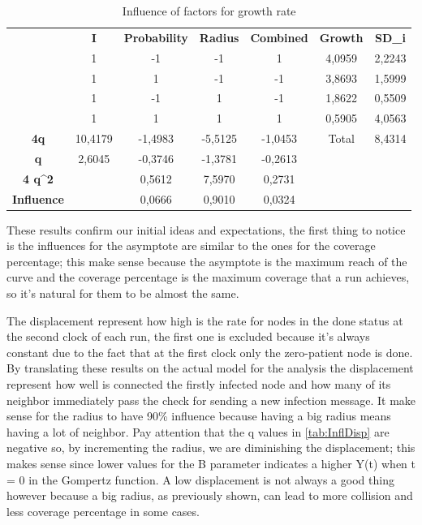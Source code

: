\begin{table}[H]
\centering
\begin{tabular}{c|c|c|c|c|cc}
\cline{2-7}
 & \textbf{I} & \textbf{Probability} & \textbf{Radius} & \textbf{Combined} & \multicolumn{1}{c|}{\textbf{Growth}} & \multicolumn{1}{c|}{\textbf{SD\_i}} \\ \cline{2-7} 
 & 1 & -1 & -1 & 1 & \multicolumn{1}{c|}{4,0959} & \multicolumn{1}{c|}{2,2243} \\ \cline{2-7} 
 & 1 & 1 & -1 & -1 & \multicolumn{1}{c|}{3,8693} & \multicolumn{1}{c|}{1,5999} \\ \cline{2-7} 
 & 1 & -1 & 1 & -1 & \multicolumn{1}{c|}{1,8622} & \multicolumn{1}{c|}{0,5509} \\ \cline{2-7} 
 & 1 & 1 & 1 & 1 & \multicolumn{1}{c|}{0,5905} & \multicolumn{1}{c|}{4,0563} \\ \hline
\multicolumn{1}{|c|}{\textbf{4q}} & 10,4179 & -1,4983 & -5,5125 & -1,0453 & \multicolumn{1}{c|}{Total} & \multicolumn{1}{c|}{8,4314} \\ \hline
\multicolumn{1}{|c|}{\textbf{q}} & 2,6045 & -0,3746 & -1,3781 & -0,2613 &  &  \\ \cline{1-5}
\multicolumn{1}{|c|}{\textbf{4 q\textasciicircum{}2}} &  & 0,5612 & 7,5970 & 0,2731 &  &  \\ \cline{1-5}
\multicolumn{1}{|c|}{\textbf{Influence}} &  & 0,0666 & 0,9010 & 0,0324 &  &  \\ \cline{1-5}
\end{tabular}
\caption{Influence of factors for growth rate}
\end{table}


These results confirm our initial ideas and expectations, the first thing to notice is the influences for the asymptote are similar to the ones for the coverage percentage; this make sense because the asymptote is the maximum reach of the curve and the coverage percentage is the maximum coverage that a run achieves, so it's natural for them to be almost the same. 

\medskip
The displacement represent how high is the rate for nodes in the done status at the second clock of each run, the first one is excluded because it's always constant due to the fact that at the first clock only the zero-patient node is done. By translating these results on the actual model for the analysis the displacement represent how well is connected the firstly infected node and how many of its neighbor immediately pass the check for sending a new infection message. It make sense for the radius to have 90\% influence because having a big radius means having a lot of neighbor. Pay attention that the q values in \ref{tab:InflDisp} are negative so, by incrementing the radius, we are diminishing the displacement; this makes sense since lower values for the B parameter indicates a higher Y(t) when t = 0 in the Gompertz function. A low displacement is not always a good thing however because a big radius, as previously shown, can lead to more collision and less coverage percentage in some cases. 

